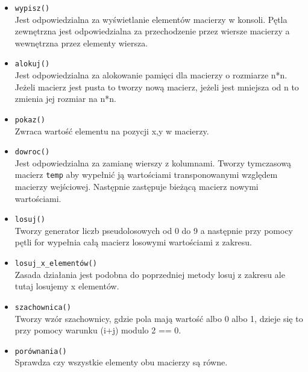 \begin{itemize}
    \item \texttt{wypisz()}\\
    Jest odpowiedzialna za wyświetlanie elementów macierzy w konsoli. Pętla zewnętrzna jest odpowiedzialna za przechodzenie przez wiersze macierzy a wewnętrzna przez elementy wiersza.

    \item \texttt{alokuj()}\\
    Jest odpowiedzialna za alokowanie pamięci dla macierzy o rozmiarze n*n. Jeżeli macierz jest pusta to tworzy nową macierz, jeżeli jest mniejsza od n to zmienia jej rozmiar na n*n.

    \item \texttt{pokaz()}\\
    Zwraca wartość elementu na pozycji x,y w macierzy.

    \item \texttt{dowroc()}\\
    Jest odpowiedzialna za zamianę wierszy z kolumnami. Tworzy tymczasową macierz \texttt{temp} aby wypełnić ją wartościami transponowanymi względem macierzy wejściowej. Następnie zastępuje bieżącą macierz nowymi wartościami.

    \item \texttt{losuj()}\\
    Tworzy generator liczb pseudolosowych od 0 do 9 a następnie przy pomocy pętli for wypełnia całą macierz losowymi wartościami z zakresu.

    \item \texttt{losuj\_x\_elementów()}\\
    Zasada działania jest podobna do poprzedniej metody losuj z zakresu ale tutaj losujemy x elementów.

    \item \texttt{szachownica()}\\
    Tworzy wzór szachownicy, gdzie pola mają wartość albo 0 albo 1, dzieje się to przy pomocy warunku (i+j) modulo 2 == 0.

    \item \texttt{porównania()}\\
    Sprawdza czy wszystkie elementy obu macierzy są równe.
\end{itemize}
